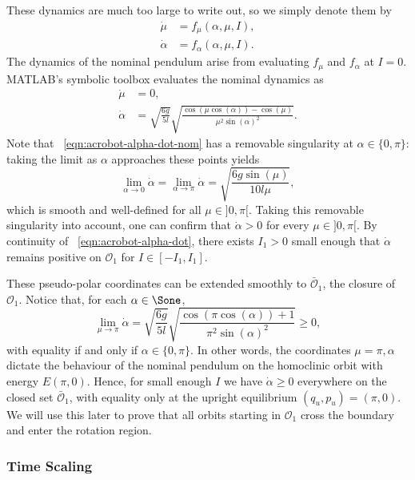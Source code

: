 These dynamics are much too large to write out, so we simply denote them by
\begin{align}\label{eqn:acrobot-mu-dot}
    \dot{\mu} &= f_\mu(\alpha,\mu,I)
    ,\\
    \label{eqn:acrobot-alpha-dot}
    \dot{\alpha} &= f_\alpha(\alpha,\mu,I)
    .
\end{align}
The dynamics of the nominal pendulum arise from evaluating
\(f_\mu\) and \(f_\alpha\) at \(I = 0\).
MATLAB's symbolic toolbox evaluates the nominal dynamics as
\begin{align}\label{eqn:acrobot-mu-dot-nom}
    \dot{\mu} &= 0
    , \\
    \label{eqn:acrobot-alpha-dot-nom}
    \dot{\alpha} &= \sqrt{\frac{6g}{5l}} 
        \sqrt{\frac{\cos(\mu\cos(\alpha)) - \cos(\mu)}
            {\mu^2 \sin(\alpha)^2}}
    .
\end{align}
Note that ~\eqref{eqn:acrobot-alpha-dot-nom} has a removable singularity at
\(\alpha \in \{0,\pi\}\): 
taking the limit as \(\alpha\) approaches these points yields
\[
    \lim \limits_{\alpha \to 0}\dot{\alpha} 
    = \lim \limits_{\alpha \to \pi} \dot{\alpha}
    = \sqrt{\frac{6g \sin(\mu)}{10l \mu}}
    ,
\]
which is smooth and well-defined for all \(\mu \in ]0,\pi[\).
Taking this removable singularity into account,
one can confirm that \(\dot{\alpha} > 0\) for every \(\mu \in ]0,\pi[\).
By continuity of ~\eqref{eqn:acrobot-alpha-dot}, there exists \(I_1 > 0\) small
enough that \(\dot{\alpha}\) remains positive on \(\mathcal{O}_1\) for 
\(I \in [-I_1,I_1]\). 

These pseudo-polar coordinates can be extended smoothly to 
\(\bar{\mathcal{O}}_1\), the closure of \(\mathcal{O}_1\).
Notice that, for each \(\alpha \in \Sone\),
\[
    \lim \limits_{\mu \to \pi} \dot{\alpha}
    = \sqrt{\frac{6g}{5l}} 
        \sqrt{\frac{\cos(\pi\cos(\alpha)) + 1}
            {\pi^2 \sin(\alpha)^2}}
    \geq 0
    ,
\]
with equality if and only if \(\alpha \in \{0,\pi\}\).
In other words, the coordinates \(\mu = \pi, \alpha\) dictate the behaviour of
the nominal pendulum on the homoclinic orbit with energy \(E(\pi,0)\).
Hence, for small enough \(I\) we have \(\dot{\alpha} \geq 0\) everywhere on the 
closed set \(\bar{\mathcal{O}}_1\), with equality only at the upright
equilibrium \((q_u,p_u) = (\pi,0)\).
We will use this later to prove that all orbits starting in
\(\mathcal{O}_1\) cross the boundary and enter the rotation region.

\subsubsection*{Time Scaling}


